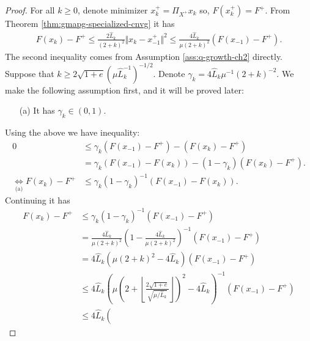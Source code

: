 \documentclass[12pt]{report}
\begin{document}
        \begin{proof}
            For all $k \ge 0$, denote minimizer $x^+_k = \Pi_{X^+}x_k$ so, $F(x^+_k) = F^+$. 
            From Theorem \ref{thm:gmapg-specialized-cnvg} it has 
            \begin{align*}
                F(x_k) - F^+ \le \frac{2 \widehat L_k}{(2 + k)^2}\Vert x_k - x_{-1}^+\Vert^2 \le \frac{4 \widehat L_k}{\mu(2 + k)^2}(F(x_{-1}) - F^+). 
            \end{align*}
            The second inequality comes from Assumption \ref{ass:q-growth-ch2} directly. 
            Suppose that $k \ge 2\sqrt{1 + e}\left(\mu\widehat L_k^{-1}\right)^{-1/2}$. 
            Denote $\gamma_k = 4\widehat L_k \mu^{-1}(2 + k)^{-2}$.
            We make the following assumption first, and it will be proved later:
            \begin{enumerate}
                \item [(a)] It has $\gamma_k \in (0, 1)$. 
            \end{enumerate}
            Using the above we have inequality: 
            \begin{align*}
                0 &\le \gamma_k (F(x_{-1}) - F^+) - (F(x_k) - F^+) 
                \\
                &= \gamma_k (F(x_{-1}) - F(x_k)) - (1 - \gamma_k)(F(x_{k}) - F^+). 
                \\
                \underset{\text{(a)}}{\iff} F(x_k) - F^+
                &\le \gamma_k(1 - \gamma_k)^{-1}(F(x_{-1}) - F(x_k)). 
            \end{align*}
            Continuing it has 
            \begin{align*}
                F(x_k) - F^+ &\le \gamma_k (1 -\gamma_k)^{-1}(F(x_{-1}) - F^+)
                \\
                &= \frac{4\widehat L_k}{\mu(2 + k)^{2}}\left(
                    1 - \frac{4\widehat L_k}{\mu(2 + k)^2}
                \right)^{-1}(F(x_{-1}) - F^+)
                \\
                &= 4\widehat L_k(\mu(2 + k)^2 - 4 \widehat L_k)(F(x_{-1}) - F^+)
                \\
                &\le 4\widehat L_k\left(
                    \mu\left(
                        2 + \left\lfloor \frac{2\sqrt{1 + e}}{\sqrt{\mu/\widehat L_k}}\right\rfloor
                    \right)^2 - 4 \widehat L_k
                \right)^{-1}(F(x_{-1}) - F^+)
                \\
                &\le 4\widehat L_k\left(

\end{align*}
\end{proof}
\end{document}
